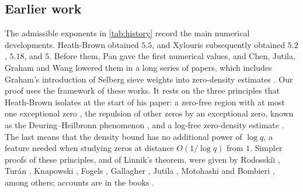 \subsection{Earlier work}
The admissible exponents in \cref{tab:history} record the main numerical developments.
Heath-Brown \cite{HeathBrown1992zero} obtained $5.5$, and Xylouris
\cite{Xylouris2009linnik,Xylouris2011least,Xylouris2011nullstellen,Xylouris2018linnik}
subsequently obtained $5.2$, $5.18$, and $5$. Before them, Pan \cite{Pan1957least,Pan1958least} gave
the first numerical values, and Chen, Jutila, Graham and Wang lowered them in a long series of
papers, which includes Graham's introduction of Selberg sieve weights into zero-density estimates
\cite{Graham1977thesis,Graham1981linnik}. Our proof uses the framework of these works. It rests on
the three principles that Heath-Brown isolates at the start of his paper: a zero-free region
with at most one exceptional zero
\cite{delaValleePoussin1896recherches,Gronwall1913series,Landau1918imaginar,Page1935number}, the
repulsion of other zeros by an exceptional zero, known as the Deuring--Heilbronn phenomenon
\cite{Deuring1933imaginare,Heilbronn1934class,Linnik1944deuring}, and a log-free zero-density
estimate \cite{Linnik1944least}. The last means that the density bound has no additional power of
$\log q$, a feature needed when studying zeros at distance $O(1/\log q)$ from $1$. Simpler proofs
of these principles, and of Linnik's theorem, were given by Rodosski\u\i{} \cite{Rodosskii1954least},
Tur\'an \cite{Turan1961density,Turan1984new}, Knapowski \cite{Knapowski1962linnik}, Fogels
\cite{Fogels1965zeros}, Gallagher \cite{Gallagher1970large}, Jutila \cite{Jutila1972density},
Motohashi \cite{Motohashi1975density,Motohashi1978primes} and Bombieri \cite{Bombieri1987grand},
among others; accounts are in the books \cite{Prachar1957primzahlverteilung,Montgomery1971topics,
IwaniecKowalski2004analytic,FriedlanderIwaniec2010opera}.

